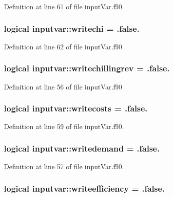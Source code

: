 Definition at line 61 of file input\-Var.\-f90.

\hypertarget{classinputvar_a6e34f329672526cc9e682125013ce5e7}{
\subsubsection[{writechi}]{\setlength{\rightskip}{0pt plus 5cm}logical inputvar\-::writechi = .false.}}\label{classinputvar_a6e34f329672526cc9e682125013ce5e7}


Definition at line 62 of file input\-Var.\-f90.

\hypertarget{classinputvar_a2d475a99a1a0efcca534104cf8e2efb5}{
\subsubsection[{writechillingrev}]{\setlength{\rightskip}{0pt plus 5cm}logical inputvar\-::writechillingrev = .false.}}\label{classinputvar_a2d475a99a1a0efcca534104cf8e2efb5}


Definition at line 56 of file input\-Var.\-f90.

\hypertarget{classinputvar_a5fa854d48ca73d10b807273f373076b2}{
\subsubsection[{writecosts}]{\setlength{\rightskip}{0pt plus 5cm}logical inputvar\-::writecosts = .false.}}\label{classinputvar_a5fa854d48ca73d10b807273f373076b2}


Definition at line 59 of file input\-Var.\-f90.

\hypertarget{classinputvar_ad6cafaf46b6d0f5bfaeb1ca26ccd0c68}{
\subsubsection[{writedemand}]{\setlength{\rightskip}{0pt plus 5cm}logical inputvar\-::writedemand = .false.}}\label{classinputvar_ad6cafaf46b6d0f5bfaeb1ca26ccd0c68}


Definition at line 57 of file input\-Var.\-f90.

\hypertarget{classinputvar_a7d67f2fa2027e1d60264f442eef9759c}{
\subsubsection[{writeefficiency}]{\setlength{\rightskip}{0pt plus 5cm}logical inputvar\-::writeefficiency = .false.}}\label{classinputvar_a7d67f2fa2027e1d60264f442eef9759c}



